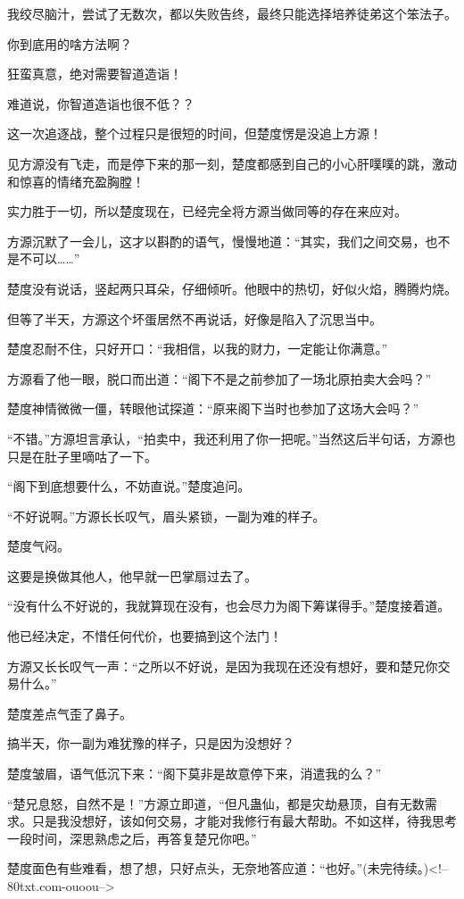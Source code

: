 \begin{this_body}
我绞尽脑汁，尝试了无数次，都以失败告终，最终只能选择培养徒弟这个笨法子。

你到底用的啥方法啊？

狂蛮真意，绝对需要智道造诣！

难道说，你智道造诣也很不低？？

这一次追逐战，整个过程只是很短的时间，但楚度愣是没追上方源！

见方源没有飞走，而是停下来的那一刻，楚度都感到自己的小心肝噗噗的跳，激动和惊喜的情绪充盈胸膛！

实力胜于一切，所以楚度现在，已经完全将方源当做同等的存在来应对。

方源沉默了一会儿，这才以斟酌的语气，慢慢地道：“其实，我们之间交易，也不是不可以……”

楚度没有说话，竖起两只耳朵，仔细倾听。他眼中的热切，好似火焰，腾腾灼烧。

但等了半天，方源这个坏蛋居然不再说话，好像是陷入了沉思当中。

楚度忍耐不住，只好开口：“我相信，以我的财力，一定能让你满意。”

方源看了他一眼，脱口而出道：“阁下不是之前参加了一场北原拍卖大会吗？”

楚度神情微微一僵，转眼他试探道：“原来阁下当时也参加了这场大会吗？”

“不错。”方源坦言承认，“拍卖中，我还利用了你一把呢。”当然这后半句话，方源也只是在肚子里嘀咕了一下。

“阁下到底想要什么，不妨直说。”楚度追问。

“不好说啊。”方源长长叹气，眉头紧锁，一副为难的样子。

楚度气闷。

这要是换做其他人，他早就一巴掌扇过去了。

“没有什么不好说的，我就算现在没有，也会尽力为阁下筹谋得手。”楚度接着道。

他已经决定，不惜任何代价，也要搞到这个法门！

方源又长长叹气一声：“之所以不好说，是因为我现在还没有想好，要和楚兄你交易什么。”

楚度差点气歪了鼻子。

搞半天，你一副为难犹豫的样子，只是因为没想好？

楚度皱眉，语气低沉下来：“阁下莫非是故意停下来，消遣我的么？”

“楚兄息怒，自然不是！”方源立即道，“但凡蛊仙，都是灾劫悬顶，自有无数需求。只是我没想好，该如何交易，才能对我修行有最大帮助。不如这样，待我思考一段时间，深思熟虑之后，再答复楚兄你吧。”

楚度面色有些难看，想了想，只好点头，无奈地答应道：“也好。”(未完待续。)<!--80txt.com-ouoou-->

\end{this_body}


